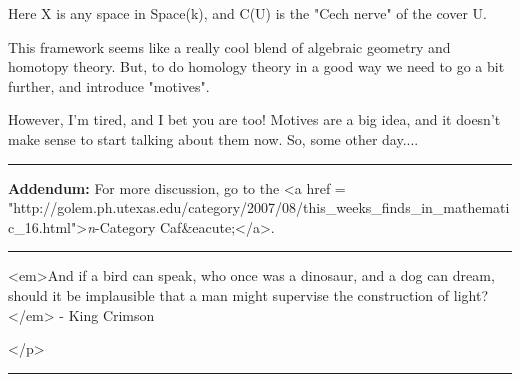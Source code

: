 Here X is any space in Space(k), and C(U) is the "Cech nerve"
of the cover U.

This framework seems like a really cool blend of algebraic 
geometry and homotopy theory.  But, to do homology theory
in a good way we need to go a bit further, and introduce "motives".

However, I'm tired, and I bet you are too!  Motives are a big
idea, and it doesn't make sense to start talking about them now.
So, some other day....

\par\noindent\rule{\textwidth}{0.4pt}
\textbf{Addendum:} 
For more discussion, go to the
<a href = "http://golem.ph.utexas.edu/category/2007/08/this_weeks_finds_in_mathematic_16.html">\emph{n}-Category Caf&eacute;</a>.


\par\noindent\rule{\textwidth}{0.4pt}
<em>And if a bird can speak, who once was a dinosaur, and a dog
can dream, should it be implausible that a man might supervise the
construction of light?</em> - King Crimson

</p>\par\noindent\rule{\textwidth}{0.4pt}
